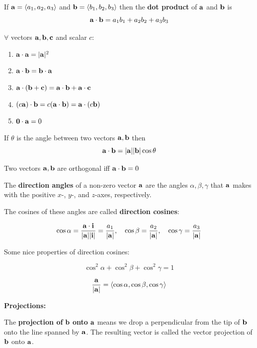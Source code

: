 \documentclass{report}
\begin{document}
\begin{definition}
If $\mathbf{a} = \langle a_1, a_2, a_3 \rangle$ and $\mathbf{b} = \langle b_1, b_2, b_3\rangle$ then the \textbf{dot product}
of $\mathbf{a} $ and $\mathbf{b}$ is 
\[
\mathbf{a} \cdot \mathbf{b} = a_1 b_1 + a_2 b_2 + a_3 b_3
\]
\end{definition}

\begin{tcolorbox}[colback=red!5!white, colframe=red!75!black, title=Properties of the Dot Product]
$\forall$ vectors $\mathbf{a}, \mathbf{b}, \mathbf{c}$ and scalar $c$:
\begin{enumerate}
    \item $\mathbf{a} \cdot \mathbf{a} = |\mathbf{a}|^2$
    \item $\mathbf{a} \cdot \mathbf{b} = \mathbf{b} \cdot \mathbf{a}$
    \item $\mathbf{a} \cdot (\mathbf{b} + \mathbf{c}) = \mathbf{a} \cdot \mathbf{b} + \mathbf{a} \cdot \mathbf{c}$
    \item $(c \mathbf{a}) \cdot \mathbf{b} = c (\mathbf{a} \cdot \mathbf{b}) = \mathbf{a} \cdot (c \mathbf{b})$
    \item $\mathbf{0} \cdot \mathbf{a} = 0$
\end{enumerate}
\end{tcolorbox}

\begin{theorem}
    If $\theta$ is the angle between two vectors $\mathbf{a}, \mathbf{b}$ then 
    \[\mathbf{a} \cdot \mathbf{b} = |\mathbf{a}| |\mathbf{b}| \cos \theta\]
\end{theorem}

\begin{corollary}
    Two vectors $\mathbf{a}, \mathbf{b}$ are orthogonal iff $\mathbf{a} \cdot \mathbf{b} = 0$
\end{corollary}

The \textbf{direction angles} of a non-zero vector $\mathbf{a}$ are the angles 
$\alpha, \beta, \gamma$ that $\mathbf{a}$ makes with the positive $x$-, $y$-, and $z$-axes, respectively.

The cosines of these angles are called \textbf{direction cosines}:

\[\cos \alpha = \frac{\mathbf{a} \cdot \mathbf{i}}{|\mathbf{a}||\mathbf{i}|} = \frac{a_1}{|\mathbf{a}|},
\quad \cos \beta = \frac{a_2}{|\mathbf{a}|},
\quad \cos \gamma = \frac{a_3}{|\mathbf{a}|}\]

Some nice properties of direction cosines:

\[\cos^2 \alpha + \cos^2 \beta + \cos^2 \gamma = 1\]

\[\frac{\mathbf{a}}{|\mathbf{a}|} = \langle \cos \alpha, \cos \beta, \cos \gamma \rangle\]

\textbf{Projections:}

The \textbf{projection of} $\mathbf{b}$ \textbf{onto} $\mathbf{a}$ means we drop a perpendicular 
from the tip of $\mathbf{b}$ onto the line spanned by $\mathbf{a}$. The resulting vector is called 
the vector projection of $\mathbf{b}$ onto $\mathbf{a}$.
\\
\end{document}
